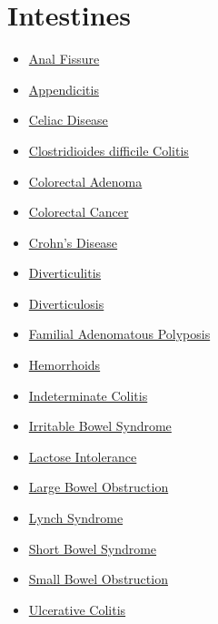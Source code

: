 \section*{Intestines}
\label{sec:organ_intestines}
\begin{itemize}[noitemsep]
  \item \hyperlink{sec:Anal Fissure}{Anal Fissure}
  \item \hyperlink{sec:Appendicitis}{Appendicitis}
  \item \hyperlink{sec:Celiac Disease}{Celiac Disease}
  \item \hyperlink{sec:Clostridioides difficile Colitis}{Clostridioides difficile Colitis}
  \item \hyperlink{sec:Colorectal Adenoma}{Colorectal Adenoma}
  \item \hyperlink{sec:Colorectal Cancer}{Colorectal Cancer}
  \item \hyperlink{sec:Crohn's Disease}{Crohn's Disease}
  \item \hyperlink{sec:Diverticulitis}{Diverticulitis}
  \item \hyperlink{sec:Diverticulosis}{Diverticulosis}
  \item \hyperlink{sec:Familial Adenomatous Polyposis}{Familial Adenomatous Polyposis}
  \item \hyperlink{sec:Hemorrhoids}{Hemorrhoids}
  \item \hyperlink{sec:Indeterminate Colitis}{Indeterminate Colitis}
  \item \hyperlink{sec:Irritable Bowel Syndrome}{Irritable Bowel Syndrome}
  \item \hyperlink{sec:Lactose Intolerance}{Lactose Intolerance}
  \item \hyperlink{sec:Large Bowel Obstruction}{Large Bowel Obstruction}
  \item \hyperlink{sec:Lynch Syndrome}{Lynch Syndrome}
  \item \hyperlink{sec:Short Bowel Syndrome}{Short Bowel Syndrome}
  \item \hyperlink{sec:Small Bowel Obstruction}{Small Bowel Obstruction}
  \item \hyperlink{sec:Ulcerative Colitis}{Ulcerative Colitis}
\end{itemize}

